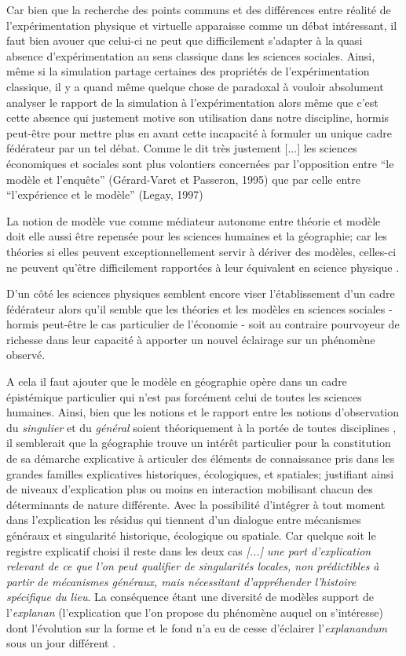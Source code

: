 Car bien que la recherche des points communs et des différences entre réalité de l'expérimentation physique et virtuelle apparaisse comme un débat intéressant, il faut bien avouer que celui-ci ne peut que difficilement s'adapter à la quasi absence d'expérimentation au sens classique dans les sciences sociales. Ainsi, même si la simulation partage certaines des propriétés de l'expérimentation classique, il y a quand même quelque chose de paradoxal à vouloir absolument analyser le rapport de la simulation à l'expérimentation alors même que c'est cette absence qui justement motive son utilisation dans notre discipline, hormis peut-être pour mettre plus en avant cette incapacité à formuler un unique cadre fédérateur par un tel débat. Comme le dit très justement \textcite{Phan2008} {[...] les sciences économiques et sociales sont plus volontiers concernées par l’opposition entre \enquote{le modèle et l’enquête}  (Gérard-Varet et Passeron, 1995) que par celle entre \enquote{l’expérience et le modèle} (Legay, 1997)}

La notion de modèle vue comme médiateur autonome entre théorie et modèle doit elle aussi être repensée pour les sciences humaines et la géographie; car les théories si elles peuvent exceptionnellement servir à dériver des modèles, celles-ci ne peuvent qu'être difficilement rapportées à leur équivalent en science physique \autocite{Pumain1997}.

D'un côté les sciences physiques semblent encore viser l'établissement d'un cadre fédérateur alors qu'il semble que les théories et les modèles en sciences sociales - hormis peut-être le cas particulier de l'économie - soit au contraire pourvoyeur de richesse dans leur capacité à apporter un nouvel éclairage sur un phénomène observé.

A cela il faut ajouter que le modèle en géographie opère dans un cadre épistémique particulier qui n'est pas forcément celui de toutes les sciences humaines. Ainsi, bien que les notions et le rapport entre les notions d'observation du \textit{singulier} et du \textit{général} soient théoriquement à la portée de toutes disciplines \autocite{Dastes1992}, il semblerait que la géographie trouve un intérêt particulier pour la constitution de sa démarche explicative à articuler des éléments de connaissance pris dans les grandes familles explicatives historiques, écologiques, et spatiales; justifiant ainsi de niveaux d'explication plus ou moins en interaction mobilisant chacun des déterminants de nature différente. Avec la possibilité d'intégrer à tout moment dans l'explication les résidus qui tiennent d'un dialogue entre mécanismes généraux et singularité historique, écologique ou spatiale. Car quelque soit le registre explicatif choisi il reste dans les deux cas \textit{ [...] une part d'explication relevant de ce que l'on peut qualifier de singularités locales, non prédictibles à partir de mécanismes généraux, mais nécessitant d'appréhender l'histoire spécifique du lieu}. La conséquence étant une diversité de modèles support de l'\textit{explanan} (l’explication que l’on propose du phénomène auquel on s’intéresse) dont l'évolution sur la forme et le fond n'a eu de cesse d'éclairer l'\textit{explanandum} sous un jour différent \autocite{Dastes1992, Sanders2000, Sanders2013}.

